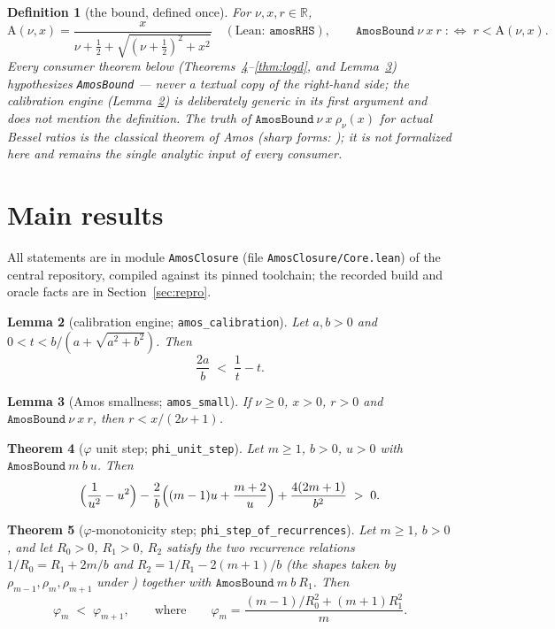 \documentclass[11pt]{article}
\newtheorem{theorem}{Theorem}[section]
\newtheorem{lemma}[theorem]{Lemma}
\newtheorem{definition}[theorem]{Definition}
\newcommand{\lean}[1]{\texttt{#1}}
\newcommand{\RHS}{\mathrm{A}}
\begin{document}
\begin{definition}[the bound, defined once]\label{def:amosbound}
For $\nu, x, r \in \mathbb{R}$,
\[
\RHS(\nu,x) = \frac{x}{\nu + \tfrac12 + \sqrt{(\nu+\tfrac12)^2 + x^2}}
\quad (\text{Lean: } \lean{amosRHS}), \qquad
\lean{AmosBound}\ \nu\ x\ r \;:\iff\; r < \RHS(\nu, x).
\]
Every consumer theorem below
(Theorems~\ref{thm:phiunit}--\ref{thm:logd}, and
Lemma~\ref{lem:small}) hypothesizes \lean{AmosBound} --- never a
textual copy of the right-hand side; the calibration engine
(Lemma~\ref{lem:calibration}) is deliberately generic in its first
argument and does not mention the definition.  The truth of
$\lean{AmosBound}\ \nu\ x\ \rho_\nu(x)$ for actual
Bessel ratios is the classical theorem of Amos \cite{Amos74} (sharp
forms: \cite{Segura11,RS16}); it is \emph{not} formalized here and
remains the single analytic input of every consumer.
\end{definition}

\section{Main results}\label{sec:results}

All statements are in module \lean{AmosClosure} (file
\lean{AmosClosure/Core.lean}) of the central repository, compiled
against its pinned toolchain; the recorded build and oracle facts are
in Section~\ref{sec:repro}.

\begin{lemma}[calibration engine;
\lean{amos\_calibration}]\label{lem:calibration}
Let $a, b > 0$ and $0 < t < b/(a + \sqrt{a^2 + b^2})$.  Then
\[
\frac{2a}{b} \;<\; \frac{1}{t} - t .
\]
\end{lemma}

\begin{lemma}[Amos smallness; \lean{amos\_small}]\label{lem:small}
If $\nu \ge 0$, $x > 0$, $r > 0$ and $\lean{AmosBound}\ \nu\ x\ r$,
then $r < x/(2\nu+1)$.
\end{lemma}

\begin{theorem}[$\varphi$ unit step;
\lean{phi\_unit\_step}]\label{thm:phiunit}
Let $m \ge 1$, $b > 0$, $u > 0$ with $\lean{AmosBound}\ m\ b\ u$.
Then
\[
\Bigl(\frac{1}{u^2} - u^2\Bigr)
- \frac{2}{b}\Bigl((m-1)u + \frac{m+2}{u}\Bigr)
+ \frac{4(2m+1)}{b^2} \;>\; 0 .
\]
\end{theorem}

\begin{theorem}[$\varphi$-monotonicity step;
\lean{phi\_step\_of\_recurrences}]\label{thm:phistep}
Let $m \ge 1$, $b > 0$, and let $R_0 > 0$, $R_1 > 0$, $R_2$ satisfy
the two recurrence relations
$1/R_0 = R_1 + 2m/b$ and $R_2 = 1/R_1 - 2(m+1)/b$
(the shapes taken by $\rho_{m-1}, \rho_m, \rho_{m+1}$ under
\cite[10.29.1]{DLMF}) together with $\lean{AmosBound}\ m\ b\ R_1$.
Then
\[
\varphi_m \;<\; \varphi_{m+1},
\qquad\text{where}\qquad
\varphi_m = \frac{(m-1)/R_0^2 + (m+1)R_1^2}{m}.
\]
\end{theorem}
\end{document}
